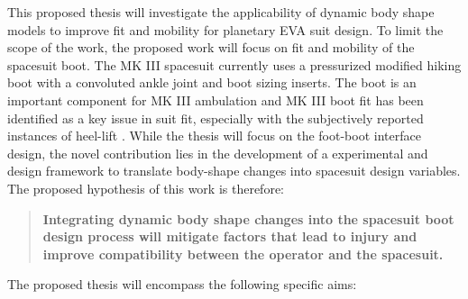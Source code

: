 \documentclass[defaultstyle,11pt]{comps}
\begin{document}
This proposed thesis will investigate the applicability of dynamic body shape models to improve fit and mobility for planetary EVA suit design.
To limit the scope of the work, the proposed work will focus on fit and mobility of the spacesuit boot.
The MK III spacesuit currently uses a pressurized modified hiking boot with a convoluted ankle joint and boot sizing inserts.
The boot is an important component for MK III ambulation and MK III boot fit has been identified as a key issue in suit fit, especially with the subjectively reported instances of heel-lift \citep{Fineman2018}.
While the thesis will focus on the foot-boot interface design, the novel contribution lies in the development of a experimental and design framework to translate body-shape changes into spacesuit design variables.
The proposed hypothesis of this work is therefore:

\begin{quote}
\textbf{Integrating dynamic body shape changes into the spacesuit boot design process will mitigate factors that lead to injury and improve compatibility between the operator and the spacesuit.}
\end{quote}

The proposed thesis will encompass the following specific aims:
\end{document}
